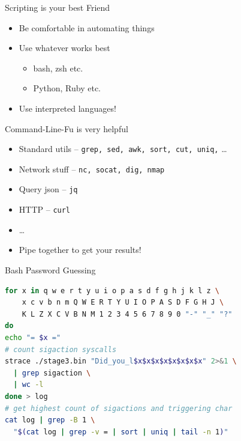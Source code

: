 \begin{frame}
  {Scripting is your best Friend}

  \begin{itemize}
    \item Be comfortable in automating things
    \item Use whatever works best
      \begin{itemize}
        \item bash, zsh etc.
        \item Python, Ruby etc.
      \end{itemize}
    \item Use interpreted languages!
  \end{itemize}

\end{frame}


\begin{frame}
  {Command-Line-Fu is very helpful}

  \begin{itemize}
    \item Standard utils -- \texttt{grep, sed, awk, sort, cut, uniq,} \ldots
    \item Network stuff -- \texttt{nc, socat, dig, nmap}
    \item Query json -- \texttt{jq}
    \item HTTP -- \texttt{curl}
    \item \ldots
  \end{itemize}

  \begin{itemize}
    \item Pipe together to get your results!
  \end{itemize}
\end{frame}




\begin{frame}[fragile]
  {Bash Password Guessing}

  \begin{lstlisting}[language=bash]
for x in q w e r t y u i o p a s d f g h j k l z \
    x c v b n m Q W E R T Y U I O P A S D F G H J \
    K L Z X C V B N M 1 2 3 4 5 6 7 8 9 0 "-" "_" "?"
do
echo "= $x ="
# count sigaction syscalls
strace ./stage3.bin "Did_you_l$x$x$x$x$x$x$x$x" 2>&1 \
  | grep sigaction \
  | wc -l
done > log
# get highest count of sigactions and triggering char
cat log | grep -B 1 \
  "$(cat log | grep -v = | sort | uniq | tail -n 1)"
  \end{lstlisting}

\end{frame}

